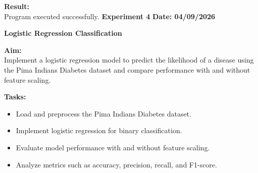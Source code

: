 \documentclass[12pt, a4paper]{article}
\begin{document}
\noindent \textbf{Result:}\\
Program executed successfully.
\newpage
\noindent \textbf{Experiment 4} \hfill \textbf{Date: 04/09/2026}\\
\begin{center} \Large \textbf{Logistic Regression Classification} \end{center}
\textbf{Aim:}\\
Implement a logistic regression model to predict the likelihood of a disease using the Pima Indians Diabetes dataset and compare performance with and without feature scaling.

\vspace{\baselineskip}
\noindent \textbf{Tasks:}\\
\vspace{-0.5\baselineskip}
\begin{itemize}[nosep]
    \item Load and preprocess the Pima Indians Diabetes dataset.
    \item Implement logistic regression for binary classification.
    \item Evaluate model performance with and without feature scaling.
    \item Analyze metrics such as accuracy, precision, recall, and F1-score.
\end{itemize}
\end{document}
